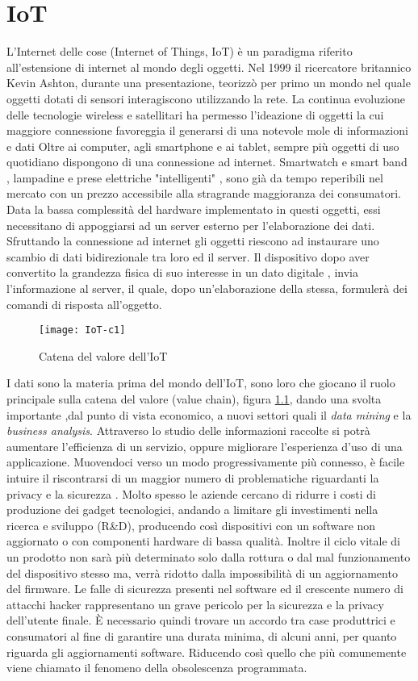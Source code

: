 \chapter{IoT}
L'Internet delle cose (Internet of Things, IoT) è un paradigma riferito
all’estensione di internet al mondo degli oggetti. Nel 1999 il ricercatore
britannico Kevin Ashton, durante una presentazione, teorizzò  per primo un mondo
nel quale oggetti dotati di sensori interagiscono utilizzando la rete.  La
continua evoluzione delle tecnologie wireless e satellitari ha permesso
l'ideazione di oggetti la cui maggiore connessione favoreggia il generarsi
di una notevole mole di informazioni e dati
Oltre ai computer, agli smartphone e ai tablet, sempre più
oggetti di uso quotidiano dispongono di una connessione ad internet. Smartwatch
e smart band , lampadine e prese elettriche "intelligenti" ,  sono già da tempo
reperibili nel mercato con un prezzo accessibile alla stragrande maggioranza dei
consumatori.  Data la bassa
complessità del hardware implementato in questi oggetti, essi necessitano di
appoggiarsi ad un server esterno per l'elaborazione dei dati.  Sfruttando la
connessione ad internet gli oggetti riescono ad instaurare uno scambio di dati
bidirezionale tra loro ed il server. Il dispositivo  dopo aver
convertito la grandezza fisica di suo interesse in un dato digitale
, invia l'informazione al server, il quale, dopo un'elaborazione della
stessa, formulerà dei comandi di risposta all'oggetto.
\\
\begin{figure}[ht]
        \centering 
                \texttt{[image: IoT-c1]}
        \caption{Catena del valore dell'IoT}
        \label{fig:IoT_chain}
\end{figure}
I dati sono la materia prima del mondo dell'IoT, sono loro che giocano il ruolo
principale sulla catena del valore (value chain), figura \ref{fig:IoT_chain},
dando una svolta importante ,dal
punto di vista economico, a nuovi settori quali il \emph{data mining} e la
\emph{business analysis}.
Attraverso lo studio delle informazioni raccolte si potrà  aumentare l’efficienza di un
servizio, oppure  migliorare l'esperienza d'uso di una applicazione.
Muovendoci verso un modo progressivamente più connesso, è facile intuire il riscontrarsi
di un maggior numero di problematiche riguardanti la privacy e la sicurezza 
.  Molto spesso le aziende cercano di ridurre i costi di produzione dei gadget
tecnologici, andando a limitare gli investimenti nella ricerca e sviluppo
(R\&D), producendo così dispositivi con un software non aggiornato o con
componenti hardware di bassa qualità.
 Inoltre il ciclo vitale di un prodotto non sarà più determinato solo dalla
rottura o dal mal funzionamento del dispositivo stesso ma, verrà ridotto dalla
impossibilità di un aggiornamento del firmware.
Le falle di sicurezza presenti nel software  ed il crescente  numero di
attacchi hacker rappresentano un grave  pericolo per la sicurezza e la privacy
dell'utente finale.
È necessario quindi trovare un accordo tra case produttrici e
consumatori al fine di garantire una durata minima, di alcuni anni, per quanto
riguarda gli aggiornamenti software. Riducendo così quello che più comunemente
viene chiamato il fenomeno della obsolescenza programmata. 
